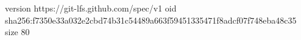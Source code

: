 version https://git-lfs.github.com/spec/v1
oid sha256:f7350e33a032e2cbd74b31c54489a663f59451335471f8adcf07f748eba48c35
size 80
